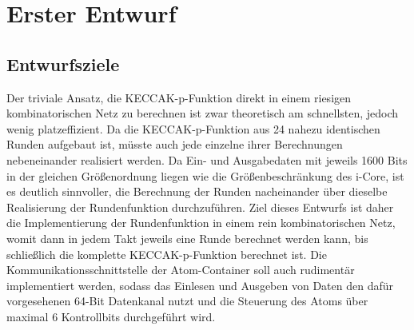 \section{Erster Entwurf}
\subsection{Entwurfsziele}
Der triviale Ansatz, die KECCAK-p-Funktion direkt in einem riesigen kombinatorischen Netz zu berechnen ist zwar theoretisch am schnellsten,
jedoch wenig platzeffizient. Da die KECCAK-p-Funktion aus 24 nahezu identischen Runden aufgebaut ist, müsste auch jede einzelne
ihrer Berechnungen nebeneinander realisiert werden. Da Ein- und Ausgabedaten mit jeweils 1600 Bits in der gleichen Größenordnung liegen
wie die Größenbeschränkung des i-Core, ist es deutlich sinnvoller, die Berechnung der Runden nacheinander über dieselbe Realisierung der Rundenfunktion durchzuführen.
Ziel dieses Entwurfs ist daher die Implementierung der Rundenfunktion in einem rein kombinatorischen Netz, womit dann in jedem Takt
jeweils eine Runde berechnet werden kann, bis schließlich die komplette KECCAK-p-Funktion berechnet ist. Die Kommunikationsschnittstelle
der Atom-Container soll auch rudimentär implementiert werden, sodass das Einlesen und Ausgeben von Daten den dafür vorgesehenen 64-Bit Datenkanal nutzt
und die Steuerung des Atoms über maximal 6 Kontrollbits durchgeführt wird.

